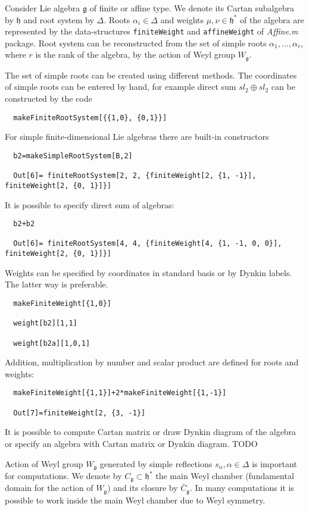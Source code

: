 \documentclass[12pt]{article}
\theoremstyle{definition}
\newcommand{\gf}{\mathfrak{g}}
\newcommand{\hf}{\mathfrak{h}}
\begin{document}
Consider Lie algebra $\gf$ of finite or affine type. We denote its Cartan subalgebra by $\hf$ and root system by $\Delta$. Roots $\alpha_i\in \Delta$ and weights $\mu,\nu\in \hf^*$ of the algebra are represented by the data-structures \lstinline{finiteWeight} and \lstinline{affineWeight} of {\it Affine.m} package. 
Root system can be reconstructed from the set of simple roots $\alpha_{1}, \dots, \alpha_{r}$, where $r$ is the rank of the algebra, by the action of Weyl group $W_{\gf}$.  

The set of simple roots can be created using different methods. The coordinates of simple roots can be entered by hand, for example direct sum $sl_{2}\oplus sl_{2}$ can be constructed by the code
\begin{lstlisting}
  makeFiniteRootSystem[{{1,0}, {0,1}}]
\end{lstlisting}
For simple finite-dimensional Lie algebras there are built-in constructors
\begin{lstlisting}
  b2=makeSimpleRootSystem[B,2]

  Out[6]= finiteRootSystem[2, 2, {finiteWeight[2, {1, -1}], finiteWeight[2, {0, 1}]}]
\end{lstlisting}

It is possible to specify direct sum of algebras:
\begin{lstlisting}
  b2+b2

  Out[6]= finiteRootSystem[4, 4, {finiteWeight[4, {1, -1, 0, 0}], finiteWeight[2, {0, 1}]}]
\end{lstlisting}

Weights can be specified by coordinates in standard basis or by Dynkin labels. The latter way is preferable. 
\begin{lstlisting}
  makeFiniteWeight[{1,0}]

  weight[b2][1,1]

  weight[b2a][1,0,1]
\end{lstlisting}

Addition, multiplication by number and scalar product are defined for roots and weights:
\begin{lstlisting}
  makeFiniteWeight[{1,1}]+2*makeFiniteWeight[{1,-1}]

  Out[7]=finiteWeight[2, {3, -1}]
\end{lstlisting}

It is possible to compute Cartan matrix or draw Dynkin diagram of the algebra or specify an algebra with Cartan matrix or Dynkin diagram. TODO

Action of Weyl group $W_{\gf}$ generated by simple reflections $s_{\alpha}, \alpha\in \Delta$ is important for computations. We denote by $C_{\gf}\subset \hf^*$ the main Weyl chamber (fundamental domain for the action of $W_{\gf}$) and its closure by $\bar C_{\gf}$. In many computations it is possible to work inside the main Weyl chamber due to Weyl symmetry. 
\end{document}
